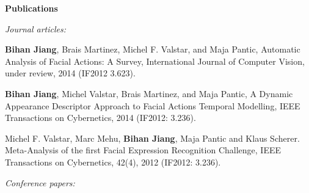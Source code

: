 \documentclass[letterpaper,11pt]{article}
\makeatletter
\newcommand{\resheading}[1]{{\large \colorbox{mygrey}{\begin{minipage}{\textwidth}{\textbf{#1 \vphantom{p\^{E}}}}\end{minipage}}}}
\newcommand{\ressubheading}[4]{
\begin{tabular*}{6.5in}{l@{\extracolsep{\fill}}r}
		\textbf{#1} & #2 \\
		\textit{#3} & \textit{#4} \\
\end{tabular*}\vspace{-6pt}}
\makeatother
\begin{document}
\begin{comment}

	\end{itemize}  %
\end{comment}

\resheading{{Publications}}
\textit{Journal articles:}
	\begin{itemize}
{ \small
\item \textbf{Bihan Jiang}, Brais Martinez, Michel F. Valstar, and Maja Pantic, Automatic Analysis of Facial Actions: A Survey, International Journal of Computer Vision, under review, 2014 (IF2012 3.623). 

\item \textbf{Bihan Jiang}, Michel Valstar, Brais Martinez, and Maja Pantic, A Dynamic Appearance Descriptor Approach to Facial Actions Temporal Modelling, IEEE Transactions on Cybernetics, 2014 (IF2012: 3.236).

\item Michel F. Valstar, Marc Mehu, \textbf{Bihan Jiang}, Maja Pantic and Klaus Scherer. Meta-Analysis of the first Facial Expression Recognition Challenge, IEEE Transactions on Cybernetics, 42(4), 2012 (IF2012: 3.236). 
}
\end{itemize}
\textit{Conference papers:}
\end{document}
